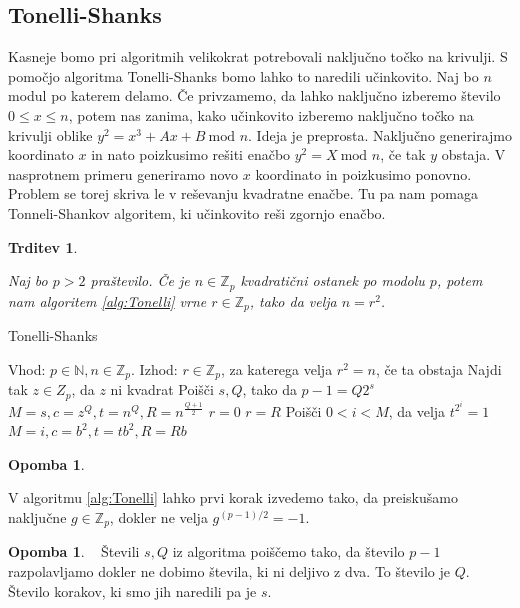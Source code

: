 \documentclass[12pt,a4paper,twoside]{article}
\theoremstyle{definition} %
\newtheorem{opomba}[definicija]{Opomba}
\theoremstyle{plain} %
\newtheorem{trditev}[definicija]{Trditev}
\numberwithin{equation}{section}  %
\newcommand{\N}{\mathbb N}
\newcommand{\Z}{\mathbb Z}
\begin{document}
\subsection{Tonelli-Shanks}
Kasneje bomo pri algoritmih velikokrat potrebovali naključno točko na krivulji. S pomočjo algoritma Tonelli-Shanks bomo lahko to naredili učinkovito. Naj bo $n$ modul po katerem delamo.
Če privzamemo, da lahko naključno izberemo število $0 \leq x \leq n$, potem nas zanima, kako učinkovito izberemo naključno točko na krivulji oblike
$y^2 = x^3 +Ax+B \ \text{mod } n$. Ideja je preprosta. Naključno generirajmo koordinato $x$ in nato poizkusimo rešiti enačbo $y^2 = X \ \text{mod } n$, če tak $y$ obstaja. V nasprotnem primeru generiramo novo $x$ koordinato in poizkusimo ponovno. Problem se torej skriva le v reševanju kvadratne enačbe. Tu pa nam pomaga Tonneli-Shankov algoritem, ki učinkovito reši zgornjo enačbo.

\begin{trditev}~

Naj bo $p > 2$ praštevilo. Če je $n \in \Z_p$ kvadratični ostanek po modolu $p$, potem nam algoritem \ref{alg:Tonelli} vrne $r \in \Z_p$, tako da velja $n = r^2$.

\end{trditev}

\begin{algorithm}[H]
\caption[Tonelli]{Tonelli-Shanks}
\label{alg:Tonelli}

\begin{algorithmic}
\State Vhod: $p \in \N, n \in \Z_p$.
\State Izhod: $r \in \Z_p$, za katerega velja $r^2=n$, če ta obstaja
\State Najdi tak $z \in Z_p$, da $z$ ni kvadrat
\State Poišči $s,Q$, tako da $p-1 = Q2^s$
\State $M = s,c = z^Q,t = n^Q,R=n^{\frac{Q+1}{2}}$
		\State \Return $r=0$
		\State \Return $r=R$
	\Else
		\State Poišči $0<i<M$, da velja $t^{2^i} = 1$
		\State  $M = i,c = b^2,t = tb^2,R=Rb$
	\EndIf
\EndWhile
\end{algorithmic}
\end{algorithm}

\begin{opomba}~

V algoritmu \ref{alg:Tonelli} lahko prvi korak izvedemo tako, da preiskušamo naključne $g\in \Z_p$, dokler ne velja $g^{(p-1)/2} = -1$.
\end{opomba}

\begin{opomba}~
Števili $s, Q$ iz algoritma poiščemo tako, da število $p-1$ razpolavljamo dokler ne dobimo števila, ki ni deljivo z dva. To število je $Q$. Število korakov, ki smo jih naredili pa je $s$.
\end{opomba}
\end{document}
